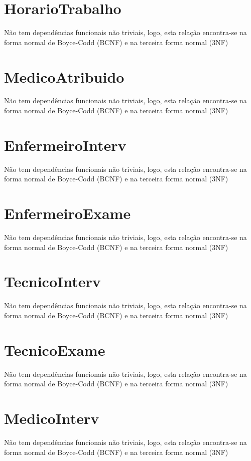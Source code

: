 \documentclass[article, a4paper, 12pt, oneside]{memoir}
\begin{document}
\section*{HorarioTrabalho}
Não tem dependências funcionais não triviais, logo, esta relação encontra-se na forma normal de Boyce-Codd (BCNF) e na terceira forma normal (3NF)

\section*{MedicoAtribuido}
Não tem dependências funcionais não triviais, logo, esta relação encontra-se na forma normal de Boyce-Codd (BCNF) e na terceira forma normal (3NF)

\section*{EnfermeiroInterv}
Não tem dependências funcionais não triviais, logo, esta relação encontra-se na forma normal de Boyce-Codd (BCNF) e na terceira forma normal (3NF)

\section*{EnfermeiroExame}
Não tem dependências funcionais não triviais, logo, esta relação encontra-se na forma normal de Boyce-Codd (BCNF) e na terceira forma normal (3NF)

\section*{TecnicoInterv}
Não tem dependências funcionais não triviais, logo, esta relação encontra-se na forma normal de Boyce-Codd (BCNF) e na terceira forma normal (3NF)

\section*{TecnicoExame}
Não tem dependências funcionais não triviais, logo, esta relação encontra-se na forma normal de Boyce-Codd (BCNF) e na terceira forma normal (3NF)

\section*{MedicoInterv}
Não tem dependências funcionais não triviais, logo, esta relação encontra-se na forma normal de Boyce-Codd (BCNF) e na terceira forma normal (3NF)
\end{document}
